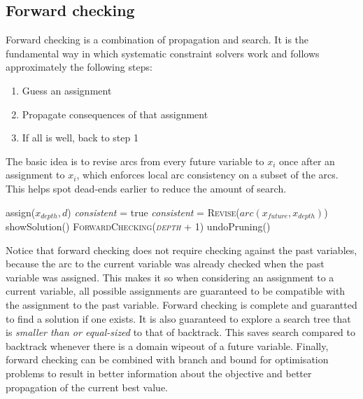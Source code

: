 \documentclass[CS4402-Notes.tex]{subfiles}
\begin{document}
\subsection{Forward checking}
Forward checking is a combination of propagation and search. It is the fundamental way in which systematic constraint solvers work and follows approximately the following steps:
\begin{enumerate}
\item Guess an assignment
\item Propagate consequences of that assignment
\item If all is well, back to step 1
\end{enumerate}
The basic idea is to revise arcs from every future variable to $x_i$ once after an assignment to $x_i$, which enforces local arc consistency on a subset of the arcs. This helps spot dead-ends earlier to reduce the amount of search.
\begin{algorithm}[H]
\begin{algorithmic}[1]
    \State assign($x_{depth}, d$)
    \State \textit{consistent} = true
        \State \textit{consistent} = \textsc{Revise($arc(x_{future}, x_{depth})$)}
    \EndFor
            \State showSolution()
        \Else
            \State \textsc{ForwardChecking(\textit{depth} + 1)}
        \EndIf
    \EndIf
    \State undoPruning()
\EndFor
\EndProcedure
\end{algorithmic}
\end{algorithm}
Notice that forward checking does not require checking against the past variables, because the arc to the current variable was already checked when the past variable was assigned. This makes it so when considering an assignment to a current variable, all possible assignments are guaranteed to be compatible with the assignment to the past variable.
\n
Forward checking is complete and guarantted to find a solution if one exists. It is also guaranteed to explore a search tree that is \textit{smaller than or equal-sized} to that of backtrack. This saves search compared to backtrack whenever there is a domain wipeout of a future variable. Finally, forward checking can be combined with branch and bound for optimisation problems to result in better information about the objective and better propagation of the current best value. 
\end{document}
